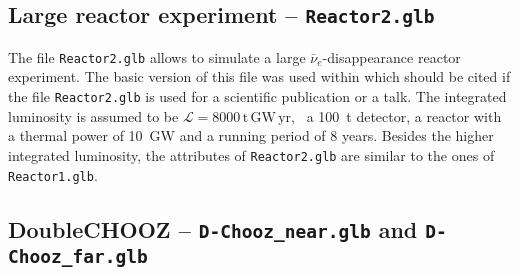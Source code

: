 \begin{appendix}
\subsection*{Large reactor experiment -- {\tt Reactor2.glb}}

The file {\tt Reactor2.glb} allows to simulate a large $\bar{\nu}_e$-disappearance reactor experiment. The basic
version of this file was used within \cite{Huber:2003pm} which should be cited if the file {\tt Reactor2.glb} is
used for a scientific publication or a talk. The integrated luminosity is assumed to be
$\mathrm{\mathcal{L} = 8000 \,t \, GW\, yr}$, \eg\ a 100~t detector, a reactor with a thermal power of 10~GW
and a running period of 8 years. Besides the higher integrated luminosity, the attributes of {\tt Reactor2.glb}
are similar to the ones of {\tt Reactor1.glb}.

\subsection*{DoubleCHOOZ -- {\tt D-Chooz\_near.glb} and {\tt D-Chooz\_far.glb}}


\end{appendix}
